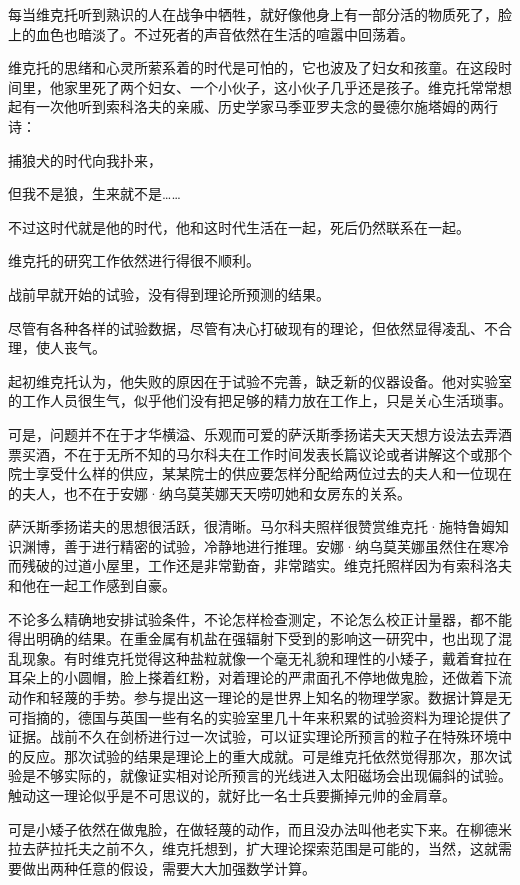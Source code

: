 每当维克托听到熟识的人在战争中牺牲，就好像他身上有一部分活的物质死了，脸上的血色也暗淡了。不过死者的声音依然在生活的喧嚣中回荡着。

维克托的思绪和心灵所萦系着的时代是可怕的，它也波及了妇女和孩童。在这段时间里，他家里死了两个妇女、一个小伙子，这小伙子几乎还是孩子。维克托常常想起有一次他听到索科洛夫的亲戚、历史学家马季亚罗夫念的曼德尔施塔姆的两行诗：

捕狼犬的时代向我扑来，

但我不是狼，生来就不是……

不过这时代就是他的时代，他和这时代生活在一起，死后仍然联系在一起。

维克托的研究工作依然进行得很不顺利。

战前早就开始的试验，没有得到理论所预测的结果。

尽管有各种各样的试验数据，尽管有决心打破现有的理论，但依然显得凌乱、不合理，使人丧气。

起初维克托认为，他失败的原因在于试验不完善，缺乏新的仪器设备。他对实验室的工作人员很生气，似乎他们没有把足够的精力放在工作上，只是关心生活琐事。

可是，问题并不在于才华横溢、乐观而可爱的萨沃斯季扬诺夫天天想方设法去弄酒票买酒，不在于无所不知的马尔科夫在工作时间发表长篇议论或者讲解这个或那个院士享受什么样的供应，某某院士的供应要怎样分配给两位过去的夫人和一位现在的夫人，也不在于安娜·纳乌莫芙娜天天唠叨她和女房东的关系。

萨沃斯季扬诺夫的思想很活跃，很清晰。马尔科夫照样很赞赏维克托·施特鲁姆知识渊博，善于进行精密的试验，冷静地进行推理。安娜·纳乌莫芙娜虽然住在寒冷而残破的过道小屋里，工作还是非常勤奋，非常踏实。维克托照样因为有索科洛夫和他在一起工作感到自豪。

不论多么精确地安排试验条件，不论怎样检查测定，不论怎么校正计量器，都不能得出明确的结果。在重金属有机盐在强辐射下受到的影响这一研究中，也出现了混乱现象。有时维克托觉得这种盐粒就像一个毫无礼貌和理性的小矮子，戴着耷拉在耳朵上的小圆帽，脸上搽着红粉，对着理论的严肃面孔不停地做鬼脸，还做着下流动作和轻蔑的手势。参与提出这一理论的是世界上知名的物理学家。数据计算是无可指摘的，德国与英国一些有名的实验室里几十年来积累的试验资料为理论提供了证据。战前不久在剑桥进行过一次试验，可以证实理论所预言的粒子在特殊环境中的反应。那次试验的结果是理论上的重大成就。可是维克托依然觉得那次，那次试验是不够实际的，就像证实相对论所预言的光线进入太阳磁场会出现偏斜的试验。触动这一理论似乎是不可思议的，就好比一名士兵要撕掉元帅的金肩章。

可是小矮子依然在做鬼脸，在做轻蔑的动作，而且没办法叫他老实下来。在柳德米拉去萨拉托夫之前不久，维克托想到，扩大理论探索范围是可能的，当然，这就需要做出两种任意的假设，需要大大加强数学计算。


